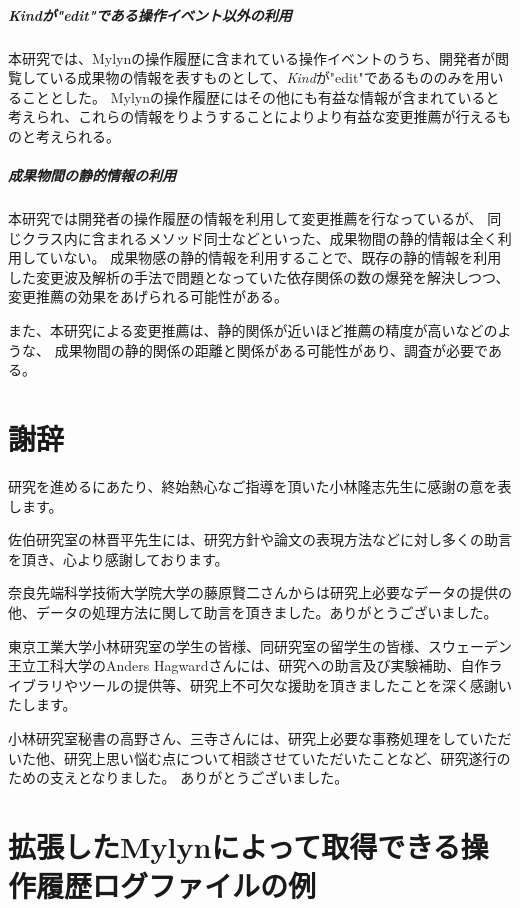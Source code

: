 \documentclass[a4paper]{jsbook}
\begin{document}
\paragraph{{\it Kind}が"edit"である操作イベント以外の利用}
本研究では、Mylynの操作履歴に含まれている操作イベントのうち、開発者が閲覧している成果物の情報を表すものとして、{\it Kind}が"edit"であるもののみを用いることとした。
Mylynの操作履歴にはその他にも有益な情報が含まれていると考えられ、これらの情報をりようすることによりより有益な変更推薦が行えるものと考えられる。
\paragraph{成果物間の静的情報の利用}
本研究では開発者の操作履歴の情報を利用して変更推薦を行なっているが、
同じクラス内に含まれるメソッド同士などといった、成果物間の静的情報は全く利用していない。
成果物感の静的情報を利用することで、既存の静的情報を利用した変更波及解析の手法で問題となっていた依存関係の数の爆発を解決しつつ、変更推薦の効果をあげられる可能性がある。

また、本研究による変更推薦は、静的関係が近いほど推薦の精度が高いなどのような、
成果物間の静的関係の距離と関係がある可能性があり、調査が必要である。

\chapter*{謝辞}
研究を進めるにあたり、終始熱心なご指導を頂いた小林隆志先生に感謝の意を表します。

佐伯研究室の林晋平先生には、研究方針や論文の表現方法などに対し多くの助言を頂き、心より感謝しております。

奈良先端科学技術大学院大学の藤原賢二さんからは研究上必要なデータの提供の他、データの処理方法に関して助言を頂きました。ありがとうございました。

東京工業大学小林研究室の学生の皆様、同研究室の留学生の皆様、スウェーデン王立工科大学のAnders Hagwardさんには、研究への助言及び実験補助、自作ライブラリやツールの提供等、研究上不可欠な援助を頂きましたことを深く感謝いたします。

小林研究室秘書の高野さん、三寺さんには、研究上必要な事務処理をしていただいた他、研究上思い悩む点について相談させていただいたことなど、研究遂行のための支えとなりました。
ありがとうございました。

\appendix
\chapter{拡張したMylynによって取得できる操作履歴ログファイルの例}\label{mylyn_log_appendix}

\end{document}
